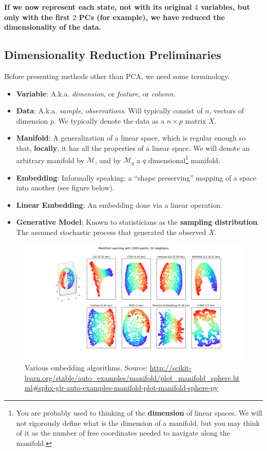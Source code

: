 \documentclass[]{book}
\providecommand{\tightlist}{%
  \setlength{\itemsep}{0pt}\setlength{\parskip}{0pt}}
\theoremstyle{definition}
\theoremstyle{definition}
\theoremstyle{definition}
\theoremstyle{remark}
\begin{document}
\textbf{If we now represent each state, not with its original \(4\)
variables, but only with the first \(2\) PCs (for example), we have
reduced the dimensionality of the data.}

\subsection{Dimensionality Reduction
Preliminaries}\label{dimensionality-reduction-preliminaries}

Before presenting methods other than PCA, we need some terminology.

\begin{itemize}
\tightlist
\item
  \textbf{Variable}: A.k.a. \emph{dimension}, or \emph{feature}, or
  \emph{column}.
\item
  \textbf{Data}: A.k.a. \emph{sample}, \emph{observations}. Will
  typically consist of \(n\), vectors of dimension \(p\). We typically
  denote the data as a \(n\times p\) matrix \(X\).
\item
  \textbf{Manifold}: A generalization of a linear space, which is
  regular enough so that, \textbf{locally}, it has all the properties of
  a linear space. We will denote an arbitrary manifold by
  \(\mathcal{M}\), and by \(\mathcal{M}_q\) a \(q\)
  dimensional\footnote{You are probably used to thinking of the
    \textbf{dimension} of linear spaces. We will not rigorously define
    what is the dimension of a manifold, but you may think of it as the
    number of free coordinates needed to navigate along the manifold.}
  manifold.
\item
  \textbf{Embedding}: Informally speaking: a ``shape preserving''
  mapping of a space into another (see figure below).
\item
  \textbf{Linear Embedding}: An embedding done via a linear operation.
\item
  \textbf{Generative Model}: Known to statisticians as the
  \textbf{sampling distribution}. The assumed stochastic process that
  generated the observed \(X\).
\end{itemize}

\begin{figure}
\centering
\includegraphics{art/sphx_glr_plot_manifold_sphere_001.png}
\caption{Various embedding algorithms. Source:
\url{http://scikit-learn.org/stable/auto_examples/manifold/plot_manifold_sphere.html\#sphx-glr-auto-examples-manifold-plot-manifold-sphere-py}}
\end{figure}
\end{document}
